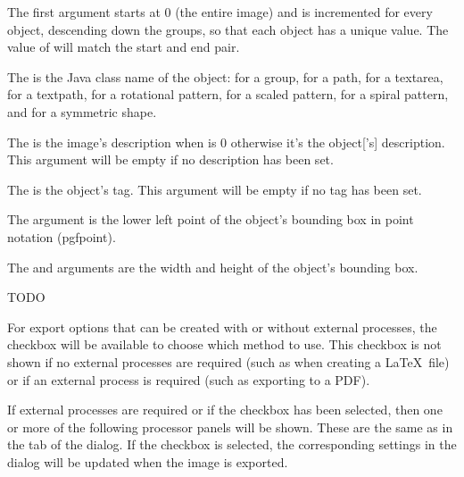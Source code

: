 The first argument  starts at 0 (the entire image) and is
incremented for every \gls{object}, descending down the
\glspl{group}, so that each \gls{object} has a unique value.
The value of  will match the start and end pair.

The  is the Java class name of the \gls{object}:
 for a \gls{group},  for a \gls{path},
 for a \gls{textarea},
 for a \gls{textpath},
 for a rotational \gls{pattern},
 for a scaled \gls{pattern},
 for a spiral \gls{pattern}, and
 for a symmetric shape.

The  is the image's description when  is 0
otherwise it's the \gls{object}['s] description. This argument will
be empty if no description has been set.

The  is the object's tag. This argument will be empty if
no tag has been set.

The  argument is the lower left point of the object's bounding
box in  point notation (\gls{pgfpoint}).

The  and  arguments are the width and
height of the object's bounding box.


TODO


For export options that can be created with or without external
processes, the  checkbox will be
available to choose which method to use. This checkbox is not
shown if no external processes are required (such as when creating a
\LaTeX\ file) or if an external process is required (such as
exporting to a PDF).


If external processes are required or if the
 checkbox has been selected, then one or
more of the following processor panels will be shown. These are the
same as in the  tab of the 
dialog.
If the  checkbox is selected, the
corresponding settings in the  dialog will be
updated when the image is exported.

